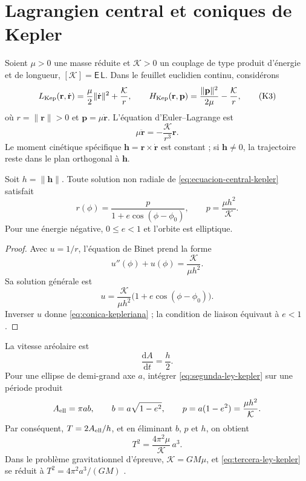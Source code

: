 \section{Lagrangien central et coniques de Kepler}
\label{sec:lagrangiano-central-kepler}

Soient \(\mu>0\) une masse réduite et
\(\mathcal K>0\) un couplage de type produit d'énergie et de longueur,
\([\mathcal K]=\mathsf E\,\mathsf L\). Dans le feuillet
euclidien continu, considérons
\[
 L_{\rm Kep}(\mathbf r,\dot{\mathbf r})
 =\frac{\mu}{2}\|\dot{\mathbf r}\|^2+\frac{\mathcal K}{r},
 \qquad
 H_{\rm Kep}(\mathbf r,\mathbf p)
 =\frac{\|\mathbf p\|^2}{2\mu}-\frac{\mathcal K}{r},
 \tag{K3}\label{eq:lagrangiano-hamiltoniano-kepler}
\]
où \(r=\|\mathbf r\|>0\) et
\(\mathbf p=\mu\dot{\mathbf r}\). L'équation d'Euler--Lagrange est
\[
 \mu\ddot{\mathbf r}
 =-\frac{\mathcal K}{r^3}\mathbf r.
 \tag{K4}\label{eq:ecuacion-central-kepler}
\]
Le moment cinétique spécifique
\(\mathbf h=\mathbf r\times\dot{\mathbf r}\) est constant ; si
\(\mathbf h\ne0\), la trajectoire reste dans le plan orthogonal à
\(\mathbf h\).

\begin{proposition}
\label{prop:conica-kepleriana-hmt-md}
Soit \(h=\|\mathbf h\|\). Toute solution non radiale de
\eqref{eq:ecuacion-central-kepler} satisfait
\[
 r(\phi)
 =\frac{p}{1+e\cos(\phi-\phi_0)},
 \qquad
 p=\frac{\mu h^2}{\mathcal K}.
 \tag{K5}\label{eq:conica-kepleriana}
\]
Pour une énergie négative, \(0\leq e<1\) et l'orbite est elliptique.
\end{proposition}

\begin{proof}
Avec \(u=1/r\), l'équation de Binet prend la forme
\[
 u''(\phi)+u(\phi)=\frac{\mathcal K}{\mu h^2}.
\]
Sa solution générale est
\[
 u=\frac{\mathcal K}{\mu h^2}
 \bigl(1+e\cos(\phi-\phi_0)\bigr).
\]
Inverser \(u\) donne \eqref{eq:conica-kepleriana} ; la condition de liaison
équivaut à \(e<1\).
\end{proof}

La vitesse aréolaire est
\[
 \frac{\mathrm dA}{\mathrm dt}=\frac h2.
 \tag{K6}\label{eq:segunda-ley-kepler}
\]
Pour une ellipse de demi-grand axe \(a\), intégrer
\eqref{eq:segunda-ley-kepler} sur une période produit
\[
 A_{\rm ell}=\pi ab,
 \qquad
 b=a\sqrt{1-e^2},
 \qquad
 p=a(1-e^2)=\frac{\mu h^2}{\mathcal K}.
\]
Par conséquent,
\(T=2A_{\rm ell}/h\), et en éliminant \(b\), \(p\) et \(h\), on obtient
\[
 T^2=\frac{4\pi^2\mu}{\mathcal K}\,a^3.
 \tag{K7}\label{eq:tercera-ley-kepler}
\]
Dans le problème gravitationnel d'épreuve,
\(\mathcal K=G M\mu\), et
\eqref{eq:tercera-ley-kepler} se réduit à
\(T^2=4\pi^2a^3/(GM)\) \cite{Kepler1609,Newton1687}.

